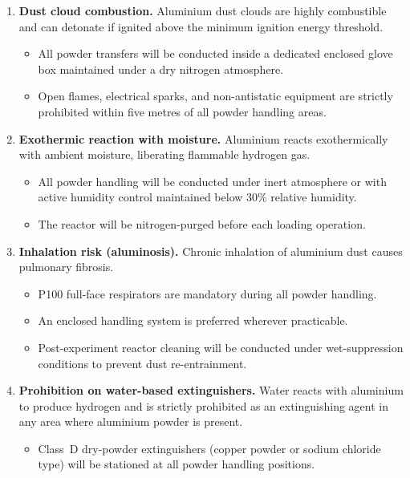 \documentclass[12pt]{article}
\begin{document}
\begin{enumerate}[label=\textbf{\arabic*.}, leftmargin=*, itemsep=6pt]

    \item \textbf{Dust cloud combustion.} Aluminium dust clouds are highly
    combustible and can detonate if ignited above the minimum ignition energy
    threshold.
    \begin{itemize}[itemsep=2pt]
        \item All powder transfers will be conducted inside a dedicated enclosed
              glove box maintained under a dry nitrogen atmosphere.
        \item Open flames, electrical sparks, and non-antistatic equipment are
              strictly prohibited within five metres of all powder handling areas.
    \end{itemize}

    \item \textbf{Exothermic reaction with moisture.} Aluminium reacts
    exothermically with ambient moisture, liberating flammable hydrogen gas.
    \begin{itemize}[itemsep=2pt]
        \item All powder handling will be conducted under inert atmosphere or with
              active humidity control maintained below 30\% relative humidity.
        \item The reactor will be nitrogen-purged before each loading operation.
    \end{itemize}

    \item \textbf{Inhalation risk (aluminosis).} Chronic inhalation of aluminium
    dust causes pulmonary fibrosis.
    \begin{itemize}[itemsep=2pt]
        \item P100 full-face respirators are mandatory during all powder handling.
        \item An enclosed handling system is preferred wherever practicable.
        \item Post-experiment reactor cleaning will be conducted under
              wet-suppression conditions to prevent dust re-entrainment.
    \end{itemize}

    \item \textbf{Prohibition on water-based extinguishers.} Water reacts with
    aluminium to produce hydrogen and is strictly prohibited as an extinguishing
    agent in any area where aluminium powder is present.
    \begin{itemize}[itemsep=2pt]
        \item Class~D dry-powder extinguishers (copper powder or sodium chloride
              type) will be stationed at all powder handling positions.
    \end{itemize}

\end{enumerate}
\end{document}
